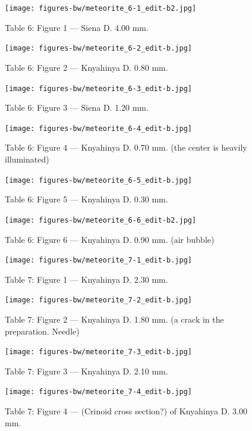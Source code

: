 \documentclass[a4paper, 12pt, oneside]{article}
\begin{document}
\clearpage
{}
\begin{figure}[t]
\texttt{[image: figures-bw/meteorite\_6-1\_edit-b2.jpg]}
\caption{Table 6: Figure 1 --- Siena D. 4.00 mm.}
\centering
\end{figure}
\clearpage
\begin{figure}[t]
\texttt{[image: figures-bw/meteorite\_6-2\_edit-b.jpg]}
\caption{Table 6: Figure 2 --- Knyahinya D. 0.80 mm.}
\centering
\end{figure}
\clearpage
\begin{figure}[t]
\texttt{[image: figures-bw/meteorite\_6-3\_edit-b.jpg]}
\caption{Table 6: Figure 3 --- Siena D. 1.20 mm.}
\centering
\end{figure}
\clearpage
\begin{figure}[t]
\texttt{[image: figures-bw/meteorite\_6-4\_edit-b.jpg]}
\caption{Table 6: Figure 4 --- Knyahinya D. 0.70 mm. (the center is heavily illuminated)}
\centering
\end{figure}
\clearpage
\begin{figure}[t]
\texttt{[image: figures-bw/meteorite\_6-5\_edit-b.jpg]}
\caption{Table 6: Figure 5 --- Knyahinya D. 0.30 mm.}
\centering
\end{figure}
\clearpage
\begin{figure}[t]
\texttt{[image: figures-bw/meteorite\_6-6\_edit-b2.jpg]}
\caption{Table 6: Figure 6 --- Knyahinya D. 0.90 mm. (air bubble)}
\centering
\end{figure}
\clearpage
{}
\begin{figure}[t]
\texttt{[image: figures-bw/meteorite\_7-1\_edit-b.jpg]}
\caption{Table 7: Figure 1 --- Knyahinya D. 2.30 mm.}
\centering
\end{figure}
\clearpage
\begin{figure}[t]
\texttt{[image: figures-bw/meteorite\_7-2\_edit-b.jpg]}
\caption{Table 7: Figure 2 --- Knyahinya D. 1.80 mm. (a crack in the preparation. Needle)}
\centering
\end{figure}
\clearpage
\begin{figure}[t]
\texttt{[image: figures-bw/meteorite\_7-3\_edit-b.jpg]}
\caption{Table 7: Figure 3 --- Knyahinya D. 2.10 mm.}
\centering
\end{figure}
\clearpage
\begin{figure}[t]
\texttt{[image: figures-bw/meteorite\_7-4\_edit-b.jpg]}
\caption{Table 7: Figure 4 --- (Crinoid cross section?) of Knyahinya D. 3.00 mm.}
\centering
\end{figure}
\end{document}
